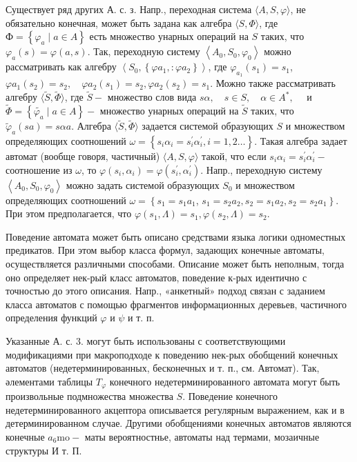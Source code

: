 \documentclass[10pt]{article}
\begin{document}
Существует ряд других А. с. з. Напр., переходная система $\langle A, S, \varphi\rangle$, не обязательно конечная, может быть задана как алгебра $\langle S, \Phi\rangle$, где $Ф=\left\{\varphi_{a} \mid a \in A\right\}$ есть множество унарных операций на $S$ таких, что $\varphi_{a}(s)=\varphi(a, s)$. Так, переходную систему $\left\langle A_{0}, S_{0}, \varphi_{0}\right\rangle$ можно рассматривать как алгебру $\left\langle S_{0},\left\{\varphi a_{1},: \varphi a_{2}\right\}\right\rangle$, где $\varphi_{a_{1}}\left(s_{1}\right)=s_{1}$, $\varphi a_{1}\left(s_{2}\right)=s_{2}, \quad \varphi a_{2}\left(s_{1}\right)=s_{2}, \varphi a_{2}\left(s_{2}\right)=s_{1}$. Можно также рассматривать алгебру $\langle\tilde{S}, \tilde{\Phi}\rangle$, где $\tilde{S}-$ множество слов вида $s \alpha, \quad s \in S, \quad \alpha \in A^{*}, \quad$ и $\tilde{\Phi}=\left\{\tilde{\varphi_{a}} \mid a \in A\right\}-$ множество унарных операций на $\tilde{S}$ таких, что $\tilde{\varphi}_{a}(s a)=s \alpha a$. Алгебра $\langle\tilde{S}, \tilde{\Phi}\rangle$ задается системой образующих $S$ и множеством определяющих соотношений $\omega=\left\{s_{i} \alpha_{i}=s_{i}^{\prime} \alpha_{i}^{\prime}, i=1,2 \ldots\right\}$. Такая алгебра задает автомат (вообще говоря, частичный) $\langle A, S, \varphi\rangle$ такой, что если $s_{i} \alpha_{i}=s_{i}^{\prime} \alpha_{i}^{\prime}-$ соотношение из $\omega$, то $\varphi\left(s_{i}, \alpha_{i}\right)=\varphi\left(s_{i}^{\prime}, \alpha_{i}^{\prime}\right)$. Напр., переходную систему $\left\langle A_{0}, S_{0}, \varphi_{0}\right\rangle$ можно задать системой образующих $S_{0}$ и множеством определяющих соотношений $\omega=\left\{s_{1}=s_{1} a_{1}\right.$, $\left.s_{1}=s_{2} a_{2}, s_{2}=s_{1} a_{2}, s_{2}=s_{2} a_{1}\right\}$. При этом предполагается, что $\varphi\left(s_{1}, \Lambda\right)=s_{1}, \varphi\left(s_{2}, \Lambda\right)=s_{2}$.



Поведение автомата может быть описано средствами языка логики одноместных предикатов. При этом выбор класса формул, задающих конечные автоматы, осуществляется различными способами. Описание может быть неполным, тогда оно определяет нек-рый класс автоматов, поведение к-рых идентично с точностью до этого описания. Напр., «анкетный» подход связан с заданием класса автоматов с помощью фрагментов информационных деревьев, частичного определения функций $\varphi$ и $\psi$ и т. п.



Указанные А. с. 3. могут быть использованы с соответствующими модификациями при макроподходе к поведению нек-рых обобщений конечных автоматов (недетерминированных, бесконечных и т. п., см. Автомат). Так, әлементами таблицы $T_{\varphi}$ конечного недетерминированного автомата могут быть произвольные подмножества множества $S$. Поведение конечного недетерминированного акцептора описывается регулярным выражением, как и в детерминированном случае. Другими обобщениями конечных автоматов являются конечные $a_{6} \mathrm{mo}-$ маты вероятностнье, автоматы над термами, мозаичные структуры И т. П.
\end{document}
